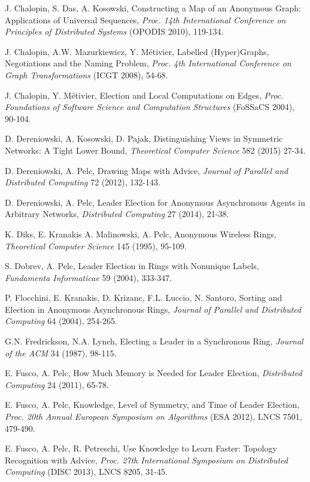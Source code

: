 \documentclass[a4paper,10pt]{article}
\begin{document}
\begin{thebibliography}{99}
J. Chalopin, S. Das, A. Kosowski, 
Constructing a Map of an Anonymous Graph: Applications of Universal Sequences,
{\em Proc. 14th International Conference on Principles of Distributed Systems} (OPODIS 2010), 119-134.

J. Chalopin, A.W. Mazurkiewicz, Y. M\'etivier, Labelled (Hyper)Graphs, Negotiations and the Naming Problem,
{\em Proc. 4th International Conference on Graph Transformations} (ICGT 2008), 54-68.

J. Chalopin, Y. M\'etivier,
Election and Local Computations on Edges,
{\em Proc. Foundations of Software Science and Computation Structures} (FoSSaCS 2004), 90-104.

D. Dereniowski, A. Kosowski, D. Pajak, Distinguishing Views in Symmetric Networks: A Tight Lower Bound,
{\em Theoretical Computer Science} 582 (2015) 27-34.

D. Dereniowski, A. Pelc, Drawing Maps with Advice,  {\em Journal of Parallel and Distributed Computing} 72 (2012), 132-143. 

D. Dereniowski, A. Pelc, Leader Election for Anonymous Asynchronous Agents in Arbitrary Networks, {\em Distributed Computing} 27 (2014), 21-38. 

K. Diks, E. Kranakis A. Malinowski, A. Pelc,
Anonymous Wireless Rings,
{\em Theoretical Computer Science} 145 (1995), 95-109.

S. Dobrev, A. Pelc, 
Leader Election in Rings with Nonunique Labels, {\em Fundamenta Informaticae} 59 (2004), 333-347. 

P. Flocchini, E. Kranakis, D. Krizanc, F.L. Luccio, N. Santoro,
Sorting and Election in Anonymous Asynchronous Rings,
{\em Journal of Parallel and Distributed Computing} 64 (2004), 254-265.

G.N. Fredrickson, N.A. Lynch,
Electing a Leader in a Synchronous Ring,
{\em Journal of the ACM} 34 (1987), 98-115.

E. Fusco, A. Pelc, How Much Memory is Needed for Leader Election, {\em Distributed Computing} 24 (2011), 65-78. 

E. Fusco, A. Pelc, Knowledge, Level of Symmetry, and Time of Leader Election,
{\em Proc. 20th Annual European Symposium on Algorithms} (ESA 2012), LNCS 7501, 479-490. 

E. Fusco, A. Pelc, R. Petreschi, Use Knowledge to Learn Faster: Topology Recognition with Advice,
{\em Proc. 27th International Symposium on Distributed Computing} (DISC 2013), LNCS 8205, 31-45. 


\end{thebibliography}
\end{document}
